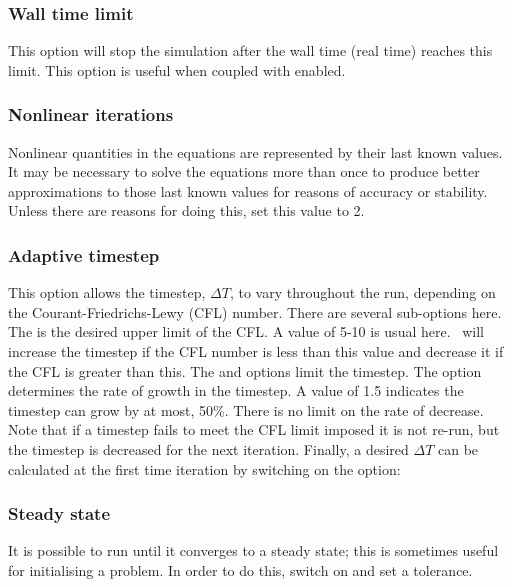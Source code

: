 \subsubsection{Wall time limit}

This option will stop the simulation after the wall time (real time) reaches
this limit. This option is useful when coupled with
 enabled.

\subsubsection{Nonlinear iterations}
Nonlinear quantities in the equations are represented by their last known
values. It may be necessary to solve the equations more than once to produce
better approximations to those last known values for reasons of accuracy or
stability. Unless there are reasons for doing this, set this value to 2.

\subsubsection{Adaptive timestep}
\label{section:config_adaptive_timestep}
This option allows the timestep, $\Delta T$, to vary throughout the run, depending on the 
Courant-Friedrichs-Lewy (CFL) number.  There are several sub-options here. The
 is the desired upper limit of the CFL. A value of 5-10 is usual
here. \fluidity\ will increase the timestep if the CFL number is less than this value and decrease
it if the CFL is greater than this. The  and 
 options limit the timestep. The option 
 determines
the rate of growth in the timestep. A value of 1.5 indicates the timestep can grow by
at most, 50\%. There is no limit on the rate of decrease. Note that if a timestep fails
to meet the CFL limit imposed it is not re-run, but the timestep is decreased for the next
iteration. Finally, a desired $\Delta T$ can be calculated at the first time iteration by
switching on the option: 

\subsubsection{Steady state}
It is possible to run \fluidity until it converges to a steady state; this is sometimes useful for initialising a problem. In order to do this, switch on  and set a tolerance. 

